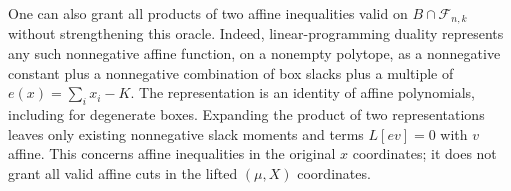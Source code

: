 One can also grant all products of two affine inequalities valid on
$B\cap\mathcal F_{n,k}$ without strengthening this oracle. Indeed,
linear-programming duality represents any such nonnegative affine
function, on a nonempty polytope, as a nonnegative constant plus a
nonnegative combination of box slacks plus a multiple of
$e(x)=\sum_i x_i-K$. The representation is an identity of affine
polynomials, including for degenerate boxes. Expanding the product of
two representations leaves only existing nonnegative slack moments and
terms $L[e v]=0$ with $v$ affine. This concerns affine inequalities in the
original $x$ coordinates; it does not grant all valid affine cuts in the
lifted $(\mu,X)$ coordinates.
